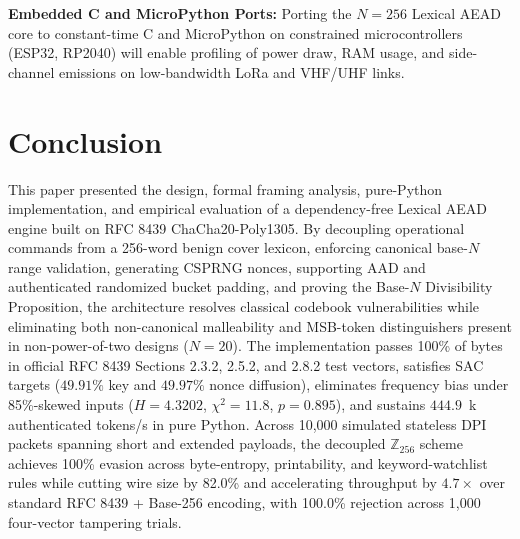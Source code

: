 \documentclass[conference]{IEEEtran}
\begin{document}
\textbf{Embedded C and MicroPython Ports:} Porting the $N=256$ Lexical AEAD core to constant-time C and MicroPython on constrained microcontrollers (ESP32, RP2040) will enable profiling of power draw, RAM usage, and side-channel emissions on low-bandwidth LoRa and VHF/UHF links.

\section{Conclusion}
\label{sec:conclusion}

This paper presented the design, formal framing analysis, pure-Python implementation, and empirical evaluation of a dependency-free Lexical AEAD engine built on RFC 8439 ChaCha20-Poly1305. By decoupling operational commands from a 256-word benign cover lexicon, enforcing canonical base-$N$ range validation, generating CSPRNG nonces, supporting AAD and authenticated randomized bucket padding, and proving the Base-$N$ Divisibility Proposition, the architecture resolves classical codebook vulnerabilities while eliminating both non-canonical malleability and MSB-token distinguishers present in non-power-of-two designs ($N=20$). The implementation passes 100\% of bytes in official RFC 8439 Sections 2.3.2, 2.5.2, and 2.8.2 test vectors, satisfies SAC targets ($49.91\%$ key and $49.97\%$ nonce diffusion), eliminates frequency bias under 85\%-skewed inputs ($H = 4.3202$, $\chi^2 = 11.8$, $p = 0.895$), and sustains $444.9$~k authenticated tokens/s in pure Python. Across 10,000 simulated stateless DPI packets spanning short and extended payloads, the decoupled $\mathbb{Z}_{256}$ scheme achieves 100\% evasion across byte-entropy, printability, and keyword-watchlist rules while cutting wire size by 82.0\% and accelerating throughput by $4.7\times$ over standard RFC 8439 + Base-256 encoding, with 100.0\% rejection across 1,000 four-vector tampering trials.



\end{document}
